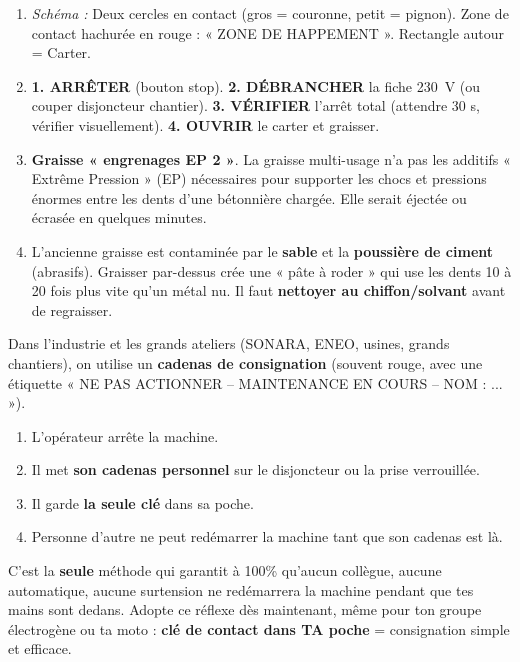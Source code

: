 \documentclass[11pt]{article}
\begin{document}
\begin{corrige}
\begin{enumerate}
    \item \textit{Schéma :} Deux cercles en contact (gros = couronne, petit = pignon). Zone de contact hachurée en rouge : « ZONE DE HAPPEMENT ». Rectangle autour = Carter.
    \item \textbf{1. ARRÊTER} (bouton stop). \textbf{2. DÉBRANCHER} la fiche \SI{230}{\V} (ou couper disjoncteur chantier). \textbf{3. VÉRIFIER} l'arrêt total (attendre 30 s, vérifier visuellement). \textbf{4. OUVRIR} le carter et graisser.
    \item \textbf{Graisse « engrenages EP 2 »}. La graisse multi-usage n'a pas les additifs « Extrême Pression » (EP) nécessaires pour supporter les chocs et pressions énormes entre les dents d'une bétonnière chargée. Elle serait éjectée ou écrasée en quelques minutes.
    \item L'ancienne graisse est contaminée par le \textbf{sable} et la \textbf{poussière de ciment} (abrasifs). Graisser par-dessus crée une « pâte à roder » qui use les dents 10 à 20 fois plus vite qu'un métal nu. Il faut \textbf{nettoyer au chiffon/solvant} avant de regraisser.
\end{enumerate}
\end{corrige}

\begin{savaistu}
Dans l'industrie et les grands ateliers (SONARA, ENEO, usines, grands chantiers), on utilise un \textbf{cadenas de consignation} (souvent rouge, avec une étiquette « NE PAS ACTIONNER – MAINTENANCE EN COURS – NOM : ... »).
\begin{enumerate}
    \item L'opérateur arrête la machine.
    \item Il met \textbf{son cadenas personnel} sur le disjoncteur ou la prise verrouillée.
    \item Il garde \textbf{la seule clé} dans sa poche.
    \item Personne d'autre ne peut redémarrer la machine tant que son cadenas est là.
\end{enumerate}
C'est la \textbf{seule} méthode qui garantit à 100\% qu'aucun collègue, aucune automatique, aucune surtension ne redémarrera la machine pendant que tes mains sont dedans. Adopte ce réflexe dès maintenant, même pour ton groupe électrogène ou ta moto : \textbf{clé de contact dans TA poche} = consignation simple et efficace.
\end{savaistu}
\end{document}
